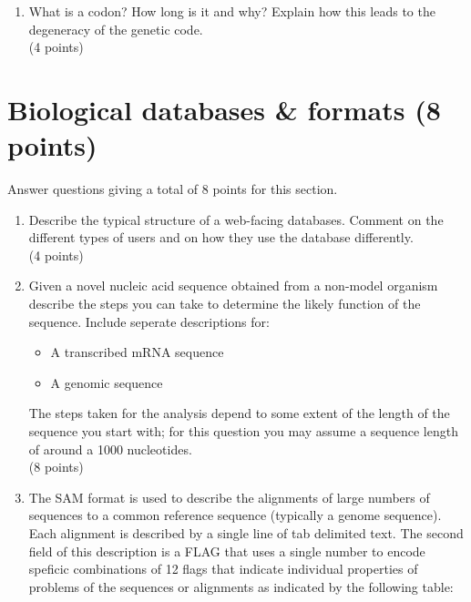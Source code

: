 \documentclass[11pt]{article}
\begin{document}
\begin{enumerate}

\item What is a codon? How long is it and why? Explain how this leads to the
  degeneracy of the genetic code.\\
(4 points)
\end{enumerate}

\section{Biological databases \& formats (8 points)}
Answer questions giving a total of 8 points for this section.
\begin{enumerate}
\item Describe the typical structure of a web-facing databases. Comment on the
  different types of users and on how they use the database differently.\\
  (4 points)

\item Given a novel nucleic acid sequence obtained from a non-model organism
  describe  the steps you can take to
  determine the likely function of the sequence. Include seperate descriptions
  for:
  \begin{itemize}
  \item A transcribed mRNA sequence
  \item A genomic sequence
  \end{itemize}
  The steps taken for the analysis depend to some extent of the length of the
  sequence you start with; for this question you may assume a sequence length
  of around a 1000 nucleotides.\\
  (8 points)

\item The SAM format is used to describe the alignments of large numbers of
  sequences to a common reference sequence (typically a genome sequence). Each
  alignment is described by a single line of tab delimited text. The second
  field of this description is a FLAG that uses a single number to encode
  speficic combinations of 12 flags that indicate individual
  properties of problems of the sequences or alignments as indicated by the
  following table:


\end{enumerate}
\end{document}
